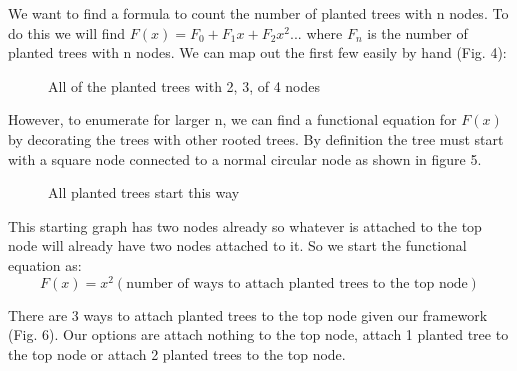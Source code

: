 \documentclass{article}
\begin{document}
We want to find a formula to count the number of planted trees with n nodes. To do this we will find \(F(x)=F_0+F_1x+F_2x^2...\) where \(F_n\) is the number of planted trees with n nodes. We can map out the first few easily by hand (Fig. 4):

\begin{figure}[!h]
\centering
{}
\caption{All of the planted trees with 2, 3, of 4 nodes}
\end{figure}

However, to enumerate for larger n, we can find a functional equation for \(F(x)\) by decorating the trees with other rooted trees. By definition the tree must start with a square node connected to a normal circular node as shown in figure 5. 

\begin{figure}[!h]
\centering
{}
\caption{All planted trees start this way}
\end{figure}

This starting graph has two nodes already so whatever is attached to the top node will already have two nodes attached to it. So we start the functional equation as:
\begin{equation}
F(x)=x^2(\text{number of ways to attach planted trees to the top node})
\end{equation}

There are 3 ways to attach planted trees to the top node given our framework (Fig. 6). Our options are attach nothing to the top node, attach 1 planted tree to the top node or attach 2 planted trees to the top node.
\end{document}
